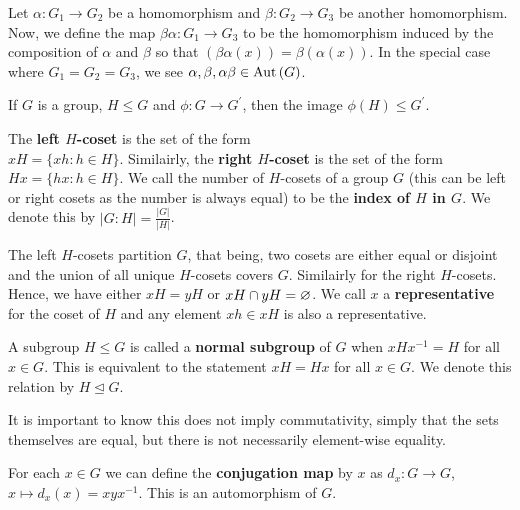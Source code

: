Let $\alpha: G_1 \to G_2$ be a homomorphism and $\beta: G_2 \to G_3$ be another homomorphism. Now, we define the map $\beta \alpha : G_1 \to G_3$ to be the homomorphism induced by the composition of $\alpha$ and $\beta$ so that $\left(\beta \alpha \left( x \right)\right) = \beta \left( \alpha \left( x \right)  \right) $. In the special case where $G_1 = G_2 = G_3$, we see $\alpha, \beta, \alpha\beta \in \operatorname{Aut}\left( G \right) $.
\begin{proposition}
	If $G$ is a group, $H \le G$ and $ \phi: G \to G^{\prime}$, then the image $\phi \left( H \right) \le G^{\prime}$.
\end{proposition}
\begin{definition}[Cosets]
	The \textbf{left $H$-coset} is the set of the form \\$xH = \{xh : h \in H\} $. Similairly, the \textbf{right $H$-coset} is the set of the form $Hx = \{hx: h \in H\} $. We call the number of $H$-cosets of a group $G$ (this can be left or right cosets as the number is always equal) to be the \textbf{index of $H$ in $G$}. We denote this by $\left| G : H \right| = \frac{\left| G \right| }{\left| H \right| }$.
\end{definition}
\begin{remark}
	The left $H$-cosets partition $G$, that being, two cosets are either equal or disjoint and the union of all unique $H$-cosets covers $G$. Similairly for the right $H$-cosets. Hence, we have either $xH = yH$ or $xH \cap yH = \varnothing$. We call $x$ a \textbf{representative} for the coset of $H$ and any element $xh \in xH$ is also a representative.
\end{remark}
\begin{definition}
	A subgroup $H\le G$ is called a \textbf{normal subgroup} of $G$ when $xHx^{-1}= H$ for all $x \in G$. This is equivalent to the statement $xH = Hx$ for all $x \in G$. We denote this relation by $H \trianglelefteq G$.
\end{definition}
\begin{remark}
	It is important to know this does not imply commutativity, simply that the sets themselves are equal, but there is not necessarily element-wise equality.
\end{remark}
\begin{definition}
	For each $x \in G$ we can define the \textbf{conjugation map} by $x$ as $ d_{x}: G \to G$, $x \mapsto d_{x}(x) = xyx^{-1} $. This is an automorphism of $G$.
\end{definition}
